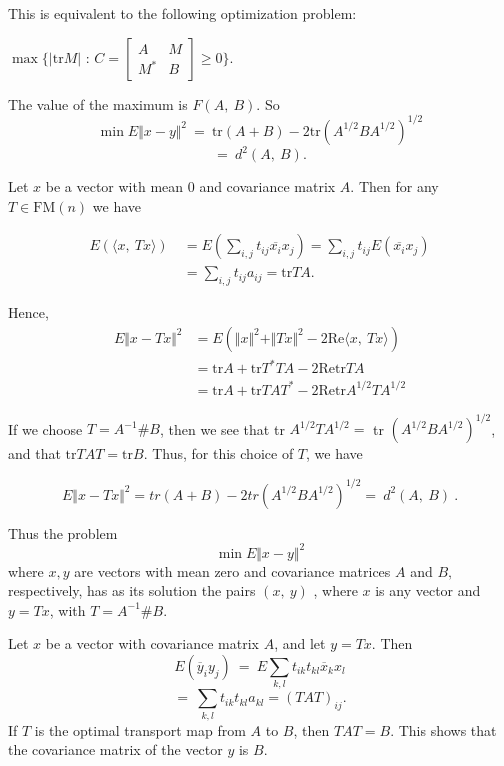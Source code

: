 This is equivalent to the following optimization problem:

$\displaystyle \max\{|\mathrm{tr}M|$ : $C=\left[ \begin{matrix}
	A & M \\
	M^{*} & B
\end{matrix}\right] \geq 0\}.$

The value of the maximum is $F(A,\ B)$. So
$$
\min E\Vert x-y\Vert^{2}\ =\ \mathrm{t}\mathrm{r}(A+B)-2\mathrm{t}\mathrm{r}(A^{1/2}BA^{1/2})^{1/2}
$$
$$
=\ d^{2}(A,\ B).
$$

Let $x$ be a vector with mean $0$ and covariance matrix $A$. Then for any $T\in \mathrm{F}\mathrm{M}(n)$ we have

\begin{align*}
E(\langle x,\ Tx\rangle)\ &= E(\sum_{i,j}t_{ij}\overline{x_{i}}x_{j}) =\sum_{i,j}t_{ij}E(\overline{x_{i}}x_{j}) \\
&= \displaystyle \sum_{i,j}t_{ij}a_{ij}=\mathrm{tr} TA.
\end{align*}

Hence,
\begin{align*}
E\Vert x-Tx\Vert^{2} &= E(\Vert x\Vert^{2}+\Vert Tx\Vert^{2} - 2\textrm{Re}\langle x,\ Tx\rangle) \\	
&= \textrm{tr}A+\textrm{tr}T^{*}TA-2\textrm{Re} \textrm{tr} TA \\
&= \textrm{tr} A+\textrm{tr}TAT^{*}-2\textrm{Re} \textrm{tr} A^{1/2}TA^{1/2}
\end{align*}

If we choose $T=A^{-1}\# B$, then  we see that tr $A^{1/2}TA^{1/2}=$ tr $(A^{1/2}BA^{1/2})^{1/2}$, and that $\mathrm{tr}TAT=\mathrm{tr}B$. Thus, for this choice of $T$, we have
\begin{center}
	$$E\Vert x-Tx\Vert^{2} = tr(A+B)-2 tr (A^{1/2}BA^{1/2})^{1/2}
	=\ d^{2}(A,\ B)\ .
	$$
\end{center}
Thus the problem
$$
\min E\Vert x-y\Vert^{2}
$$
where $x, y$ are vectors with mean zero and covariance matrices $A$ and $B,$ respectively, has as its solution the pairs $(x,\ y)$ , where $x$ is any vector and $y=Tx$, with $T=A^{-1}\# B$.

Let $x$ be a vector with covariance matrix $A$, and let $y=Tx$. Then
$$
E(\overline{y}_{i}y_{j})\ =\ E\sum_{k,l}t_{ik}t_{kl}\overline{x}_{k}x_{l}
$$
$$
=\ \sum_{k,l}t_{ik}t_{kl}a_{kl}=(TAT)_{ij}.
$$
If $T$ is the optimal transport map from $A$ to $B$, then $TAT=B$. This shows that the covariance matrix of the vector $y$ is $B.$

